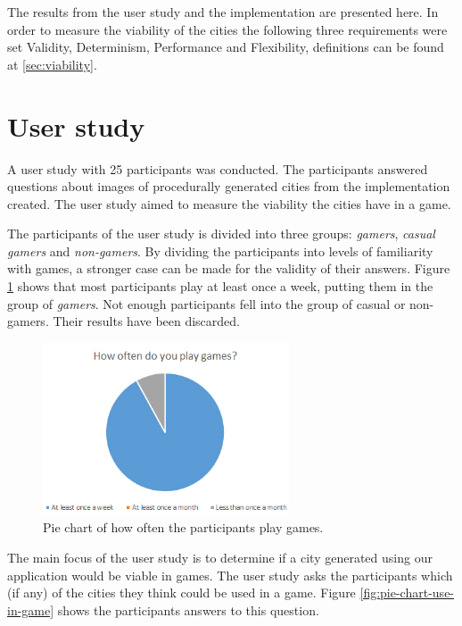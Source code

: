 The results from the user study and the implementation are presented here. In order to measure the viability of the cities the following three requirements were set Validity, Determinism, Performance and Flexibility, definitions can be found at \ref{sec:viability}.
	
\section{User study}
A user study with 25 participants was conducted. The participants answered questions about images of procedurally generated cities from the implementation created. The user study aimed to measure the viability the cities have in a game.
	

\par
The participants of the user study is divided into three groups: \textit{gamers}, \textit{casual gamers} and \textit{non-gamers}. By dividing the participants into levels of familiarity with games, a stronger case can be made for the validity of their answers. Figure \ref{fig:pie-chart-often-play} shows that most participants play at least once a week, putting them in the group of \textit{gamers}. Not enough participants fell into the group of casual or non-gamers. Their results have been discarded.

\begin{figure}[h]
	\centering
	\includegraphics[width=0.65\textwidth]{"Images/OftenPlay"}
	\caption{Pie chart of how often the participants play games.}
	\label{fig:pie-chart-often-play}
\end{figure}

The main focus of the user study is to determine if a city generated using our application would be viable in games. The user study asks the participants which (if any) of the cities they think could be used in a game. Figure \ref{fig:pie-chart-use-in-game} shows the participants answers to this question.

